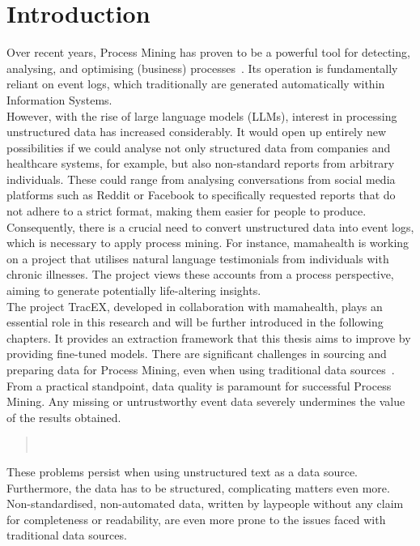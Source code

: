 \section{Introduction}\label{sec:intro}
Over recent years, Process Mining has proven to be a powerful tool for detecting, analysing, and optimising (business) processes~\cite{weske_business_2012}. Its operation is fundamentally reliant on event logs, which traditionally are generated automatically within Information Systems.\\
However, with the rise of large language models (LLMs), interest in processing unstructured data has increased considerably. It would open up entirely new possibilities if we could analyse not only structured data from companies and healthcare systems, for example, but also non-standard reports from arbitrary individuals. These could range from analysing conversations from social media platforms such as Reddit or Facebook to specifically requested reports that do not adhere to a strict format, making them easier for people to produce.\\
Consequently, there is a crucial need to convert unstructured data into event logs, which is necessary to apply process mining. For instance, mamahealth is working on a project that utilises natural language testimonials from individuals with chronic illnesses. The project views these accounts from a process perspective, aiming to generate potentially life-altering insights.\\
The project TracEX, developed in collaboration with mamahealth, plays an essential role in this research and will be further introduced in the following chapters. It provides an extraction framework that this thesis aims to improve by providing fine-tuned models. There are significant challenges in sourcing and preparing data for Process Mining, even when using traditional data sources~\cite{van_der_aalst_process_2016}. From a practical standpoint, data quality is paramount for successful Process Mining. Any missing or untrustworthy event data severely undermines the value of the results obtained. 
\begin{quote}
    ~\cite{van_der_aalst_process_2016}    
\end{quote}
These problems persist when using unstructured text as a data source. Furthermore, the data has to be structured, complicating matters even more. Non-standardised, non-automated data, written by laypeople without any claim for completeness or readability, are even more prone to the issues faced with traditional data sources.\\
